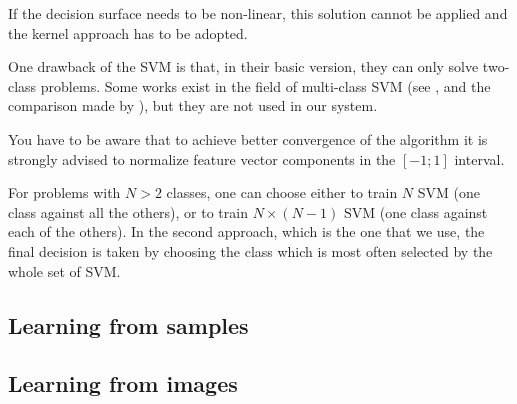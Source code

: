 	If the decision surface needs to be non-linear, this solution
	cannot be applied and the kernel approach has to be adopted.


One drawback of the SVM is that, in their basic version, they can only
solve two-class problems. Some works exist in the field of multi-class
SVM (see \cite{allwein00reducing,weston98multiclass}, and the
comparison made by \cite{hsu01comparison}), but they are
not used in our system.

You have to be aware that to achieve better convergence of the algorithm it is 
strongly advised to normalize feature vector components in the $[-1;1]$ 
interval.

For problems with $N > 2$ classes, one can choose either to train $N$
SVM (one class against all the others), or to train $N\times(N-1)$ SVM
(one class against each of the others). In the second approach, which
is the one that we use, the final decision is taken by choosing the
class which is most often selected by the whole set of SVM.



\subsection{Learning from samples}
\label{ssec:LearningFromSamples}


\subsection{Learning from images}
\label{ssec:LearningFromImages}



%

%

%


